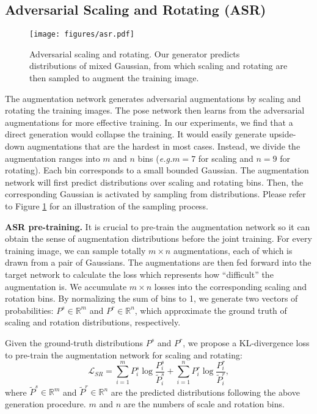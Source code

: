 \documentclass[10pt,twocolumn,letterpaper]{article}
\begin{document}
\subsection{Adversarial Scaling and Rotating (ASR)}\label{sec:asr}\begin{figure}[t!]
\centering
\texttt{[image: figures/asr.pdf]}
\caption{Adversarial scaling and rotating. Our generator predicts distributions of mixed Gaussian, from which scaling and rotating are then sampled to augment the training image.}
\label{fig:asr}
\end{figure}

The augmentation network generates adversarial augmentations by scaling and rotating the training images. The pose network then learns from the adversarial augmentations for more effective training. In our experiments, we find that a direct generation would collapse the training. It would easily generate upside-down augmentations that are the hardest in most cases. Instead, we divide the augmentation ranges into $m$ and $n$ bins ({\it e.g.}$m=7$ for scaling and $n=9$ for rotating). Each bin corresponds to a small bounded Gaussian. The augmentation network will first predict distributions over scaling and rotating bins. Then, the corresponding Gaussian is activated by sampling from distributions. Please refer to Figure \ref{fig:asr} for an illustration of the sampling process.

{\bf ASR pre-training.} It is crucial to pre-train the augmentation network so it can obtain the sense of augmentation distributions before the joint training. For every training image, we can sample totally $m \times n$ augmentations, each of which is drawn from a pair of Gaussians. The augmentations are then fed forward into the target network to calculate the loss which represents how ``difficult'' the augmentation is. We accumulate $m \times n$ losses into the corresponding scaling and rotation bins. By normalizing the sum of bins to 1, we generate two vectors of probabilities: $P^s \in \mathbb{R}^m$ and $P^r \in \mathbb{R}^n$, which approximate the ground truth of scaling and rotation distributions, respectively.

Given the ground-truth distributions $P^s$ and $P^r$, we propose a KL-divergence loss to pre-train the augmentation network for scaling and rotating:
\begin{equation}\label{eq:loss-ASR}
    \mathcal{L}_{SR}=\sum_{i=1}^mP_i^s \log\frac{P_i^s}{\tilde{P}_i^s}+\sum_{i=1}^nP_i^r \log\frac{P_i^r}{\tilde{P}_i^r},
\end{equation}
where $\tilde{P}^s \in \mathbb{R}^m$ and $\tilde{P}^r \in \mathbb{R}^n$ are the predicted distributions following the above generation procedure. $m$ and $n$ are the numbers of scale and rotation bins.
\end{document}
